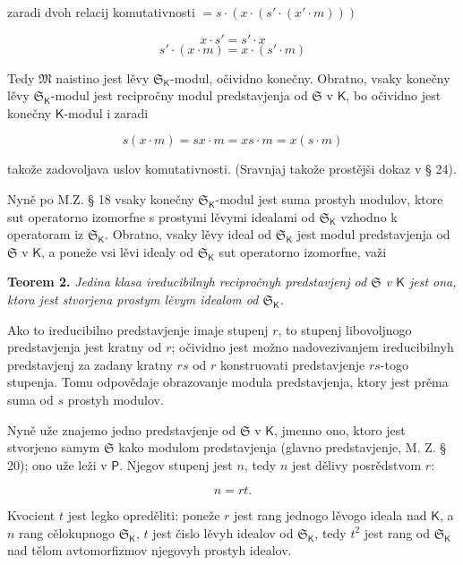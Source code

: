 \documentclass[11pt]{article}
\begin{document}
zaradi dvoh relacij komutativnosti \(=s\cdot(x\cdot(s'\cdot(x'\cdot m)))\)

\[
x\cdot s'=s'\cdot x
\]
\[
s'\cdot(x\cdot m)=x\cdot(s'\cdot m)
\]

Tedy \(\mathfrak M\) naistino jest lěvy \(\mathfrak S_{\mathsf K}\)-modul, očividno konečny. Obratno, vsaky konečny lěvy \(\mathfrak S_{\mathsf K}\)-modul jest recipročny modul predstavjenja od \(\mathfrak S\) v \(\mathsf K\), bo očividno jest konečny \(\mathsf K\)-modul i zaradi

\[
s(x\cdot m)=sx\cdot m=xs\cdot m=x(s\cdot m)
\]

takože zadovoljava uslov komutativnosti. (Sravnjaj takože prostějši dokaz v § 24).

Nyně po M.Z. § 18 vsaky konečny \(\mathfrak S_{\mathsf K}\)-modul jest suma prostyh modulov, ktore sut operatorno izomorfne s prostymi lěvymi idealami od \(\mathfrak S_{\mathsf K}\) vzhodno k operatoram iz \(\mathfrak S_{\mathsf K}\). Obratno, vsaky lěvy ideal od \(\mathfrak S_{\mathsf K}\) jest modul predstavjenja od \(\mathfrak S\) v \(\mathsf K\), a poneže vsi lěvi idealy od \(\mathfrak S_{\mathsf K}\) sut operatorno izomorfne, važi

\textbf{Teorem 2.} \emph{Jedina klasa ireducibilnyh recipročnyh predstavjenj od \(\mathfrak S\) v \(\mathsf K\) jest ona, ktora jest stvorjena prostym lěvym idealom od \(\mathfrak S_{\mathsf K}\).}

Ako to ireducibilno predstavjenje imaje stupenj \(r\), to stupenj libovoljnogo predstavjenja jest kratny od \(r\); očividno jest možno nadovezivanjem ireducibilnyh predstavjenj za zadany kratny \(rs\) od \(r\) konstruovati predstavjenje \(rs\)-togo stupenja. Tomu odpovědaje obrazovanje modula predstavjenja, ktory jest prěma suma od \(s\) prostyh modulov.

Nyně uže znajemo jedno predstavjenje od \(\mathfrak S\) v \(\mathsf K\), jmenno ono, ktoro jest stvorjeno samym \(\mathfrak S\) kako modulom predstavjenja (glavno predstavjenje, M. Z. § 20); ono uže leži v \(\mathsf P\). Njegov stupenj jest \(n\), tedy \(n\) jest dělivy posrědstvom \(r\):

\[
n=rt.
\]

Kvocient \(t\) jest legko opreděliti: poneže \(r\) jest rang jednogo lěvogo ideala nad \(\mathsf K\), a \(n\) rang cělokupnogo \(\mathfrak S_{\mathsf K}\), \(t\) jest čislo lěvyh idealov od \(\mathfrak S_{\mathsf K}\), tedy \(t^2\) jest rang od \(\mathfrak S_{\mathsf K}\) nad tělom avtomorfizmov njegovyh prostyh idealov.
\end{document}
